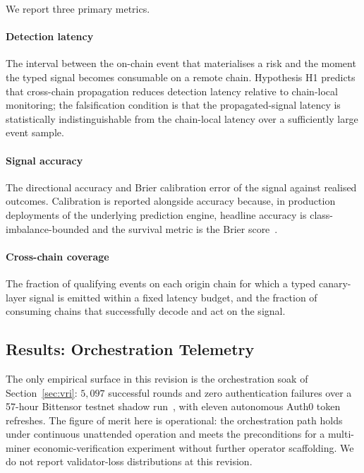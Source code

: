 \documentclass[journal]{IEEEtran}
\begin{document}
We report three primary metrics.

\paragraph*{Detection latency}
The interval between the on-chain event that materialises a risk and
the moment the typed signal becomes consumable on a remote chain.
Hypothesis H1 predicts that cross-chain propagation reduces detection
latency relative to chain-local monitoring; the falsification
condition is that the propagated-signal latency is statistically
indistinguishable from the chain-local latency over a sufficiently
large event sample.

\paragraph*{Signal accuracy}
The directional accuracy and Brier calibration error of the signal
against realised outcomes. Calibration is reported alongside accuracy
because, in production deployments of the underlying prediction
engine, headline accuracy is class-imbalance-bounded and the survival
metric is the Brier
score~\cite{omnirisk2026predmetrics,omnirisk2026agentic}.

\paragraph*{Cross-chain coverage}
The fraction of qualifying events on each origin chain for which a
typed canary-layer signal is emitted within a fixed latency budget,
and the fraction of consuming chains that successfully decode and act
on the signal.

\subsection{Results: Orchestration Telemetry}

The only empirical surface in this revision is the orchestration soak
of Section~\ref{sec:vri}: $5{,}097$ successful rounds and zero
authentication failures over a 57-hour Bittensor testnet shadow
run~\cite{omnirisk2026soak}, with eleven autonomous Auth0 token
refreshes. The figure of merit here is operational: the orchestration
path holds under continuous unattended operation and meets the
preconditions for a multi-miner economic-verification experiment
without further operator scaffolding. We do not report validator-loss
distributions at this revision.
\end{document}
